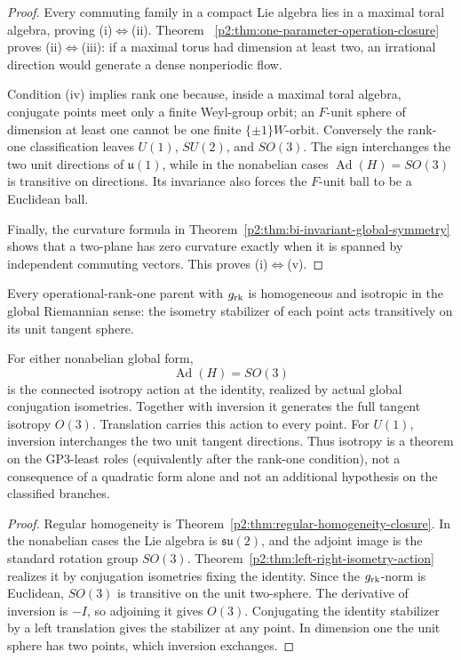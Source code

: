\documentclass[11pt,a4paper]{article}
\begin{document}
\begin{proof}
Every commuting family in a compact Lie algebra lies in a maximal toral
algebra, proving (i)\(\Leftrightarrow\)(ii).  Theorem~
\ref{p2:thm:one-parameter-operation-closure} proves
(ii)\(\Leftrightarrow\)(iii): if a maximal torus had dimension at least two,
an irrational direction would generate a dense nonperiodic flow.

Condition (iv) implies rank one because, inside a maximal toral algebra,
conjugate points meet only a finite Weyl-group orbit; an \(F\)-unit sphere of
dimension at least one cannot be one finite
\(\{\pm1\}W\)-orbit.  Conversely the rank-one classification leaves
\(U(1)\), \(SU(2)\), and \(SO(3)\).  The sign interchanges the two unit
directions of \(\mathfrak u(1)\), while in the nonabelian cases
\(\operatorname{Ad}(H)=SO(3)\) is transitive on directions.  Its invariance
also forces the \(F\)-unit ball to be a Euclidean ball.

Finally, the curvature formula in
Theorem~\ref{p2:thm:bi-invariant-global-symmetry} shows that a two-plane has
zero curvature exactly when it is spanned by independent commuting vectors.
This proves (i)\(\Leftrightarrow\)(v).
\end{proof}

\begin{theorem}
\label{p2:thm:rank-one-actual-isotropy}
Every operational-rank-one parent with \(g_{\rm rk}\) is homogeneous and
isotropic in the global Riemannian sense: the isometry stabilizer of each
point acts transitively on its unit tangent sphere.

For either nonabelian global form,
\[
 \operatorname{Ad}(H)=SO(3)
\]
is the connected isotropy action at the identity, realized by actual global
conjugation isometries.  Together with inversion it generates the full tangent
isotropy \(O(3)\).  Translation carries this action to every point.  For
\(U(1)\), inversion interchanges the two unit tangent directions.
Thus isotropy is a theorem on the GP3-least roles (equivalently after the
rank-one condition), not a consequence of a quadratic form alone and not an
additional hypothesis on the classified branches.
\end{theorem}

\begin{proof}
Regular homogeneity is
Theorem~\ref{p2:thm:regular-homogeneity-closure}.  In the nonabelian cases the
Lie algebra is \(\mathfrak{su}(2)\), and the adjoint image is the standard
rotation group \(SO(3)\).  Theorem~\ref{p2:thm:left-right-isometry-action}
realizes it by conjugation isometries fixing the identity.  Since the
\(g_{\rm rk}\)-norm is Euclidean, \(SO(3)\) is transitive on the unit
two-sphere.
The derivative of inversion is \(-I\), so adjoining it gives \(O(3)\).
Conjugating the identity stabilizer by a left translation gives the
stabilizer at any point.  In dimension one the unit sphere has two points,
which inversion exchanges.
\end{proof}
\end{document}
